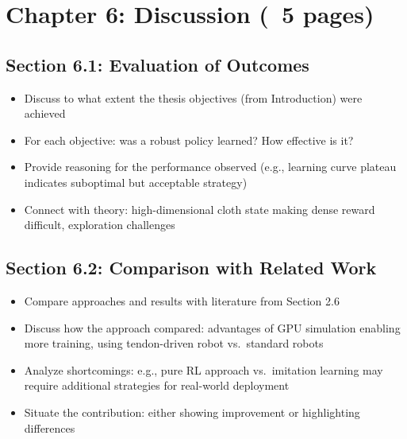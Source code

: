 \section{Chapter 6: Discussion (~5 pages)}

\subsection{Section 6.1: Evaluation of Outcomes}
\begin{itemize}
    \item Discuss to what extent the thesis objectives (from Introduction) were achieved
    \item For each objective: was a robust policy learned? How effective is it?
    \item Provide reasoning for the performance observed (e.g., learning curve plateau indicates suboptimal but acceptable strategy)
    \item Connect with theory: high-dimensional cloth state making dense reward difficult, exploration challenges
\end{itemize}

\subsection{Section 6.2: Comparison with Related Work}
\begin{itemize}
    \item Compare approaches and results with literature from Section 2.6
    \item Discuss how the approach compared: advantages of GPU simulation enabling more training, using tendon-driven robot vs.\ standard robots
    \item Analyze shortcomings: e.g., pure RL approach vs.\ imitation learning may require additional strategies for real-world deployment
    \item Situate the contribution: either showing improvement or highlighting differences
\end{itemize}

